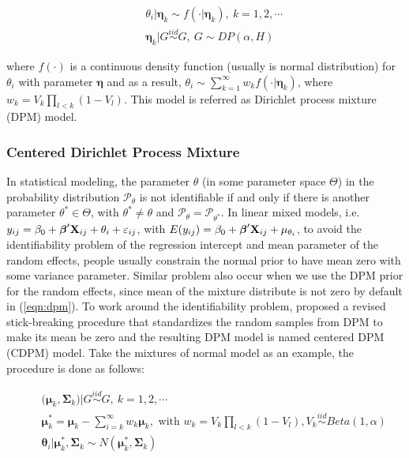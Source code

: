 \documentclass[12pt]{article}
\begin{document}
\begin{eqnarray}\label{eqn:dpm}
&& \theta_i|\boldsymbol{\eta}_{k} \sim f(\cdot|\boldsymbol{\eta}_k), \ k=1, 2, \cdots\\
&& \boldsymbol{\eta}_k|G\overset{iid}\sim G,\  G\sim DP(\alpha, H)\nonumber
\end{eqnarray}

\noindent where $f(\cdot)$ is a continuous density function (usually is normal distribution) for $\theta_i$ with parameter $\boldsymbol{\eta}$ and  as a result, $\theta_i\sim\sum_{k=1}^{\infty}w_kf(\cdot|\boldsymbol{\eta}_k)$, where $w_k=V_k\prod_{l<k}(1-V_l)$. This model is referred as Dirichlet process mixture (DPM) model\cite{escobar1995bayesian}. 


\subsubsection{Centered Dirichlet Process Mixture}\label{sec:DPM}%
In statistical modeling, the parameter $\theta$ (in some parameter space $\Theta$) in the probability distribution $\mathcal{P}_\theta$ is not identifiable if and only if there is another parameter $\theta^*\in \Theta$, with $\theta^*\ne\theta$ and $\mathcal{P}_{\theta}=\mathcal{P}_{\theta^*}$. In linear mixed models, i.e. $y_{ij}=\beta_0+\boldsymbol{\beta}'{\bf X}_{ij}+\theta_i+\varepsilon_{ij}$, with $E(y_{ij})=\beta_0+\boldsymbol{\beta}'{\bf X}_{ij}+\mu_{\theta_i}$, to avoid the identifiability problem of the regression intercept and mean parameter of the random effects, people usually constrain the normal prior to have mean zero with some variance parameter. Similar problem also occur when we use the DPM prior for the random effects, since mean of the mixture distribute is not zero by default in (\ref{eqn:dpm}). To work around the identifiability problem, \cite{yang2010semiparametric} proposed a revised stick-breaking procedure that standardizes the random samples from DPM to make its mean be zero and the resulting DPM model is named centered DPM (CDPM) model. Take the mixtures of normal model as an example, the procedure is done as follows:

\begin{eqnarray}\label{eqn:cdpm}
&& \boldsymbol (\boldsymbol{\mu}_k, \boldsymbol{\Sigma}_k)|G\overset{iid}\sim G,\ k=1,2,\cdots\nonumber\\
&& \boldsymbol{\mu}^*_k=\boldsymbol{\mu}_k-\sum_{i=k}^{\infty}w_k\boldsymbol{\mu}_k , \mbox{ with } w_k=V_k\prod_{l<k}(1-V_l),V_k\overset{iid}\sim Beta(1,\alpha)\\
&& \boldsymbol{\theta}_i|\boldsymbol{\mu}^*_k, \boldsymbol{\Sigma}_k\sim N(\boldsymbol{\mu}^*_k, \boldsymbol{\Sigma}_k)\nonumber
\end{eqnarray}
\end{document}
